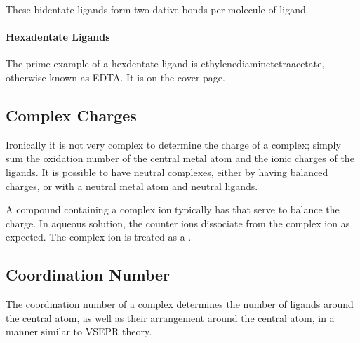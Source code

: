 			These bidentate ligands form two dative bonds per molecule of ligand.


			\pagebreak
			\paragraph{Hexadentate Ligands}

			The prime example of a hexdentate ligand is ethylenediaminetetraacetate, otherwise known as EDTA. It is on the cover page.




		\subsection{Complex Charges}

			Ironically it is not very complex to determine the charge of a complex; simply sum the oxidation number of the central metal atom and
			the ionic charges of the ligands. It is possible to have neutral complexes, either by having balanced charges, or with a neutral
			metal atom and neutral ligands.

			A compound containing a complex ion typically has  that serve to balance the charge. In aqueous solution, the
			counter ions dissociate from the complex ion as expected. The complex ion is treated as a .



		\pagebreak
		\subsection{Coordination Number}

			The coordination number of a complex determines the number of ligands around the central atom, as well as their arrangement around
			the central atom, in a manner similar to VSEPR theory.

